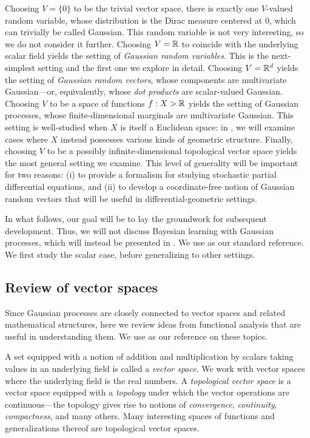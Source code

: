 \documentclass[11pt]{book}
\begin{document}
\1  Choosing $V = \{0\}$ to be the trivial vector space, there is exactly one $V$-valued random variable, whose distribution is the Dirac measure centered at $0$, which can trivially be called Gaussian.
This random variable is not very interesting, so we do not consider it further.
\2 Choosing $V = \mathbb{R}$ to coincide with the underlying scalar field yields the setting of \emph{Gaussian random variables}.
This is the next-simplest setting and the first one we explore in detail.
\3 Choosing $V = \mathbb{R}^d$ yields the setting of \emph{Gaussian random vectors}, whose components are multivariate Gaussian---or, equivalently, whose \emph{dot products} are scalar-valued Gaussian.
\4 Choosing $V$ to be a space of functions $f : X \-> \mathbb{R}$ yields the setting of Gaussian processes, whose finite-dimensional marginals are multivariate Gaussian.
This setting is well-studied when $X$ is itself a Euclidean space: in , we will examine cases where $X$ instead possesses various kinds of geometric structure.
\5 Finally, choosing $V$ to be a possibly infinite-dimensional topological vector space yields the most general setting we examine.
This level of generality will be important for two reasons: (i) to provide a formalism for studying stochastic partial differential equations, and (ii) to develop a coordinate-free notion of Gaussian random vectors that will be useful in differential-geometric settings.
\0 

In what follows, our goal will be to lay the groundwork for subsequent development.
Thus, we will not discuss Bayesian learning with Gaussian processes, which will instead be presented in .
We use \textcite{lifshits12} as our standard reference.
We first study the scalar case, before generalizing to other settings.

\subsection{Review of vector spaces}
Since Gaussian processes are closely connected to vector spaces and related mathematical structures, here we review ideas from functional analysis that are useful in understanding them.
We use \textcite{lang12} as our reference on these topics.

A set equipped with a notion of addition and multiplication by scalars taking values in an underlying field is called a \emph{vector space}.
We work with vector spaces where the underlying field is the real numbers.
A \emph{topological vector space} is a vector space equipped with a \emph{topology} under which the vector operations are continuous---the topology gives rise to notions of \emph{convergence}, \emph{continuity}, \emph{compactness}, and many others.
Many interesting spaces of functions and generalizations thereof are topological vector spaces.
\end{document}
